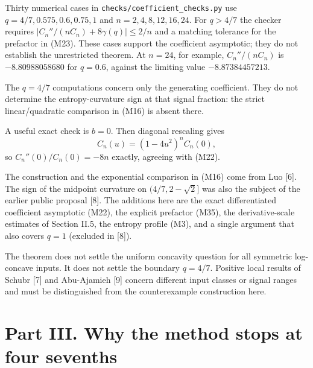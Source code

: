 \documentclass[
  british,
  10pt,
]{article}
\begin{document}
Thirty numerical cases in \texttt{checks/coefficient\_checks.py} use
\(q=4/7,0.575,0.6,0.75,1\) and \(n=2,4,8,12,16,24\). For \(q>4/7\) the
checker requires \(|C_n''/(nC_n)+8\gamma(q)|\le2/n\) and a matching
tolerance for the prefactor in (M23). These cases support the
coefficient asymptotic; they do not establish the unrestricted theorem.
At \(n=24\), for example, \(C_n''/(nC_n)\) is \(-8.80988058680\) for
\(q=0.6\), against the limiting value \(-8.87384457213\).

The \(q=4/7\) computations concern only the generating coefficient. They
do not determine the entropy-curvature sign at that signal fraction: the
strict linear/quadratic comparison in (M16) is absent there.

A useful exact check is \(b=0\). Then diagonal rescaling gives \[
C_n(u)=(1-4u^2)^nC_n(0),
\] so \(C_n''(0)/C_n(0)=-8n\) exactly, agreeing with (M22).

The construction and the exponential comparison in (M16) come from Luo
{[}6{]}. The sign of the midpoint curvature on \((4/7,2-\sqrt2]\) was
also the subject of the earlier public proposal {[}8{]}. The additions
here are the exact differentiated coefficient asymptotic (M22), the
explicit prefactor (M35), the derivative-scale estimates of Section
II.5, the entropy profile (M3), and a single argument that also covers
\(q=1\) (excluded in {[}8{]}).

The theorem does not settle the uniform concavity question for all
symmetric log-concave inputs. It does not settle the boundary \(q=4/7\).
Positive local results of Schubr {[}7{]} and Abu-Ajamieh {[}9{]} concern
different input classes or signal ranges and must be distinguished from
the counterexample construction here.

\section{Part III. Why the method stops at four
sevenths}\label{part-iii.-why-the-method-stops-at-four-sevenths}
\end{document}
